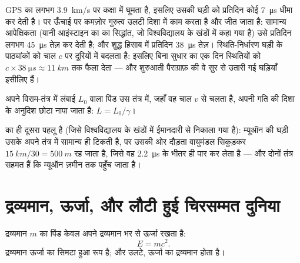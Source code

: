 \begin{remark}[GPS का आपेक्षिकता-बिल]\label{rem:g12:special-relativity:gps}
GPS का  लगभग \qty{3.9}{km/s} पर कक्षा में घूमता है, इसलिए
 उसकी घड़ी को प्रतिदिन कोई \qty{7}{\micro s} धीमा कर देती है।
पर ऊँचाई पर कमज़ोर गुरुत्व उलटी दिशा में काम करता है और जीत जाता है:
सामान्य आपेक्षिकता (यानी आइंस्टाइन का  का सिद्धांत, जो
विश्वविद्यालय के खंडों में कहा गया है) उसे प्रतिदिन लगभग \qty{45}{\micro s} तेज़ कर देती
है; और शुद्ध हिसाब में प्रतिदिन \qty{38}{\micro s} तेज़। स्थिति-निर्धारण घड़ी के पाठ्यांकों
को चाल $c$ पर दूरियों में बदलता है: इसलिए बिना सुधार का एक दिन स्थितियों को
$c \times \qty{38}{\micro s} \approx \qty{11}{km}$ तक फैला देता --- और शुरुआती पैराग्राफ़ की वे सुर से उतारी गई घड़ियाँ
इसीलिए हैं।
\end{remark}

\begin{proposition}[लंबाई-संकुचन]\label{prop:g12:special-relativity:contraction}
अपने विराम-तंत्र में लंबाई $L_0$ वाला पिंड उस तंत्र में, जहाँ वह चाल $v$
से चलता है, अपनी गति की दिशा के अनुदिश छोटा नापा जाता है: $L = L_0/\gamma$।
\end{proposition}
\admitted

\begin{remark}[म्यूऑन की अपनी कहानी]\label{rem:g12:special-relativity:muonframe}
  का ही दूसरा पहलू है (जिसे
विश्वविद्यालय के खंडों में ईमानदारी से निकाला गया है): म्यूऑन की घड़ी उसके अपने
तंत्र में सामान्य ही टिकती है, पर उसकी ओर दौड़ता वायुमंडल सिकुड़कर $\qty{15}{km}/30 =
\qty{500}{m}$ रह
जाता है, जिसे वह \qty{2.2}{\micro s} के भीतर ही पार कर लेता है --- और दोनों तंत्र सहमत हैं
कि म्यूऑन ज़मीन तक पहुँच जाता है।
\end{remark}

\section{द्रव्यमान, ऊर्जा, और लौटी हुई चिरसम्मत दुनिया}

\begin{theorem}[द्रव्यमान--ऊर्जा तुल्यता]\label{thm:g12:special-relativity:emc2}
द्रव्यमान $m$ का पिंड केवल अपने द्रव्यमान भर से ऊर्जा रखता है:
\[ E = m c^2 . \]
द्रव्यमान ऊर्जा का सिमटा हुआ रूप है; और उलटे, ऊर्जा का
द्रव्यमान होता है।
\end{theorem}
\admitted

